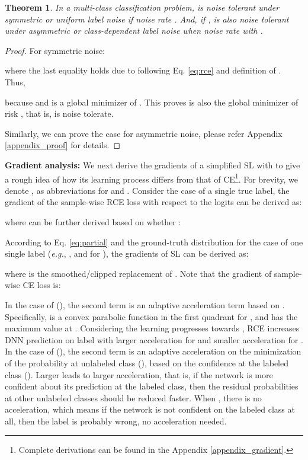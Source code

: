 \documentclass[10pt,twocolumn,letterpaper]{article}
\newtheorem{theorem}{Theorem}
\begin{document}
\begin{theorem}\label{theorem_1}
In a multi-class classification problem,  is noise tolerant under symmetric or uniform label noise if noise rate . And, if ,  is also noise tolerant under asymmetric or class-dependent label noise when noise rate  with .
\end{theorem}
\begin{proof}
For symmetric noise:

where the last equality holds due to  following Eq. \eqref{eq:rce} and definition of . Thus, 
	
because  and  is a global minimizer of . This proves  is also the global minimizer of risk , that is,  is noise tolerate. 
	
Similarly, we can prove the case for asymmetric noise, please refer Appendix \ref{appendix_proof} for details.
\end{proof}

\noindent\textbf{Gradient analysis:}
We next derive the gradients of a simplified SL with  to give a rough idea of how its learning process differs from that of CE\footnote{Complete derivations can be found in the Appendix \ref{appendix_gradient}.}. For brevity, we denote ,  as abbreviations for  and . Consider the case of a single true label, the gradient of the sample-wise RCE loss with respect to the logits  can be derived as:

where  can be further derived based on whether :

According to Eq. \eqref{eq:partial} and the ground-truth distribution for the case of one single label (\textit{e.g.}, , and  for ), the gradients of SL can be derived as:

where  is the smoothed/clipped replacement of . Note that the gradient of sample-wise CE loss  is:


In the case of  (), the second term  is an adaptive acceleration term based on . Specifically,  is a convex parabolic function in the first quadrant for , and has the maximum value at . Considering the learning progresses towards , RCE increases DNN prediction on label  with larger acceleration for  and smaller acceleration for . In the case of  (), the second term  is an adaptive acceleration on the minimization of the probability at unlabeled class (), based on the confidence at the labeled class (). Larger  leads to larger acceleration, that is, if the network is more confident about its prediction at the labeled class, then the residual probabilities at other unlabeled classes should be reduced faster. When , there is no acceleration, which means if the network is not confident on the labeled class at all, then the label is probably wrong, no acceleration needed.
\end{document}
